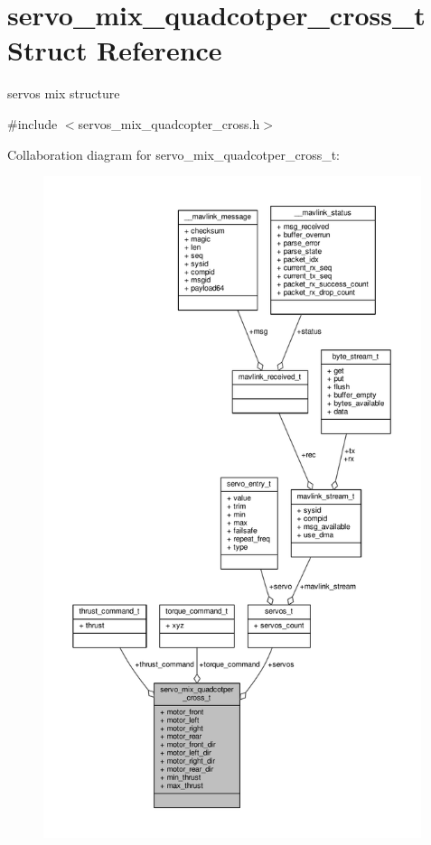 \hypertarget{structservo__mix__quadcotper__cross__t}{\section{servo\+\_\+mix\+\_\+quadcotper\+\_\+cross\+\_\+t Struct Reference}
\label{structservo__mix__quadcotper__cross__t}
}


servos mix structure  




{\ttfamily \#include $<$servos\+\_\+mix\+\_\+quadcopter\+\_\+cross.\+h$>$}



Collaboration diagram for servo\+\_\+mix\+\_\+quadcotper\+\_\+cross\+\_\+t\+:
\nopagebreak
\begin{figure}[H]
\begin{center}
\leavevmode
\includegraphics[height=550pt]{structservo__mix__quadcotper__cross__t__coll__graph}
\end{center}
\end{figure}
